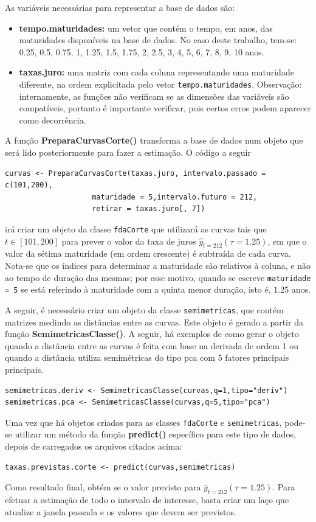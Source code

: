 \documentclass[
	12pt,				%
	openright,			%
	oneside,			%
	a4paper,			%
	english,			%
	brazil				%
	]{dissertacao-ufrgs-abntex2}
\begin{document}
\begin{apendicesenv}
As variáveis necessárias para representar a base de dados são:
\begin{itemize}
\item \textbf{tempo.maturidades:} um vetor que contém o tempo, em anos, das maturidades disponíveis na base de dados. No caso deste trabalho, tem-se:
0.25, 0.5, 0.75, 1,  1.25,  1.5,  1.75,	2,	2.5,	3,	4,	5,	6,	7,	8,	9,	10 anos.
\item \textbf{taxas.juro:} uma matriz com cada coluna representando uma maturidade diferente, na ordem explicitada pelo vetor \texttt{tempo.maturidades}. Observação: internamente, as funções não verificam se as dimensões das variáveis são compatíveis, portanto é importante verificar, pois certos erros podem aparecer como decorrência.
\end{itemize}

A função \textbf{PreparaCurvasCorte()} transforma a base de dados num objeto que será lido posteriormente para fazer a estimação. O código a seguir
\begin{lstlisting}
curvas <- PreparaCurvasCorte(taxas.juro, intervalo.passado = c(101,200),
				    maturidade = 5,intervalo.futuro = 212, 
				    retirar = taxas.juro[, 7])
\end{lstlisting}
irá criar um objeto da classe \texttt{fdaCorte} que utilizará as curvas tais que $t \in [101,200]$ para prever o valor da taxa de juros $\hat{y}_{t=212}(\tau = 1.25)$, em que o valor da sétima maturidade (em ordem crescente) é subtraída de cada curva. Nota-se que os índices para determinar a maturidade são relativos à coluna, e não ao tempo de duração das mesmas; por esse motivo, quando se escreve \texttt{maturidade = 5} se está referindo à maturidade com a quinta menor duração, isto é, $1.25$ anos.

A seguir, é necessário criar um objeto da classe \texttt{semimetricas}, que contém matrizes medindo as distâncias entre as curvas. Este objeto é gerado a partir da função \textbf{SemimetricasClasse()}. A seguir, há exemplos de como gerar o objeto quando a distância entre as curvas é feita com base na derivada de ordem 1 ou quando a distância utiliza semimétricas do tipo pca com 5 fatores principais principais.
\begin{lstlisting} 
semimetricas.deriv <- SemimetricasClasse(curvas,q=1,tipo="deriv")
semimetricas.pca <- SemimetricasClasse(curvas,q=5,tipo="pca")
\end{lstlisting}
Uma vez que há objetos criados para as classes \texttt{fdaCorte} e \texttt{semimetricas}, pode-se utilizar um método da função \textbf{predict()} específico para este tipo de dados, depois de carregados os arquivos citados acima:
\begin{lstlisting}
taxas.previstas.corte <- predict(curvas,semimetricas)
\end{lstlisting}
Como resultado final, obtém se o valor previsto para $\hat{y}_{t=212}(\tau = 1.25)$. Para efetuar a estimação de todo o intervalo de interesse, basta criar um laço que atualize a janela passada e os valores que devem ser previstos.


\end{apendicesenv}
\end{document}
